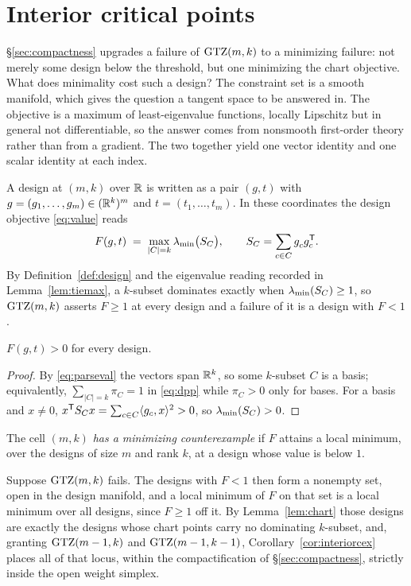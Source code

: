 \section{Interior critical points}\label{sec:interior}

\S\ref{sec:compactness} upgrades a failure of $\mathrm{GTZ}(m,k)$ to a
minimizing failure: not merely some design below the threshold, but one
minimizing the chart objective.  What does minimality cost such a design?
The constraint
set is a smooth manifold, which gives the question a tangent space to be
answered in.  The objective is a maximum of least-eigenvalue functions,
locally Lipschitz but in general not differentiable, so the answer
comes from nonsmooth first-order theory rather than from a gradient.  The
two together yield one vector identity and one scalar identity at each
index.

A design at $(m,k)$ over $\mathbb{R}$ is written as a pair $(g,t)$ with
$g=(g_1,\dots,g_m)\in(\mathbb{R}^k)^m$ and $t=(t_1,\dots,t_m)$.  In these
coordinates the design objective \eqref{eq:value} reads
\begin{equation}\label{eq:designobjective}
  F(g,t)\;=\;\max_{\lvert C\rvert=k}\lmin\bigl(\SC\bigr),
  \qquad \SC=\sum_{c\in C}g_c^{\vphantom{\mathsf{T}}}g_c\tp.
\end{equation}
By Definition~\ref{def:design} and the eigenvalue reading recorded in
Lemma~\ref{lem:tiemax}, a $k$-subset dominates exactly when
$\lambda_{\min}(S_{C})\ge1$, so $\mathrm{GTZ}(m,k)$ asserts $F\ge1$ at every design and a
failure of it is a design with $F<1$.

\begin{lemma}\label{lem:fpos}
$F(g,t)>0$ for every design.
\end{lemma}

\begin{proof}
By \eqref{eq:parseval} the vectors span $\mathbb{R}^k$, so some $k$-subset $C$ is
a basis; equivalently, $\sum_{\lvert C\rvert=k}\pi_C=1$ in
\eqref{eq:dpp} while $\pi_C>0$ only for bases.  For a basis and $x\ne0$,
$x^{\mathsf{T}}S_{C} x=\sum_{c\in C}\langle g_c,x\rangle^2>0$, so $\lambda_{\min}(S_{C})>0$.
\end{proof}

\begin{definition}\label{def:extremalcex}
The cell $(m,k)$ \emph{has a minimizing counterexample} if $F$ attains a
local minimum, over the designs of size $m$ and rank $k$, at a design
whose value is below $1$.
\end{definition}

Suppose $\mathrm{GTZ}(m,k)$ fails.  The designs with $F<1$ then form a nonempty
set, open in the design manifold, and a local minimum of $F$ on that set
is a local minimum over all designs, since $F\ge1$ off it.  By
Lemma~\ref{lem:chart} those designs are exactly the designs whose chart
points carry no dominating $k$-subset, and, granting $\mathrm{GTZ}(m-1,k)$ and
$\mathrm{GTZ}(m-1,k-1)$, Corollary~\ref{cor:interiorcex} places all of that
locus, within the compactification of \S\ref{sec:compactness}, strictly
inside the open weight simplex.

